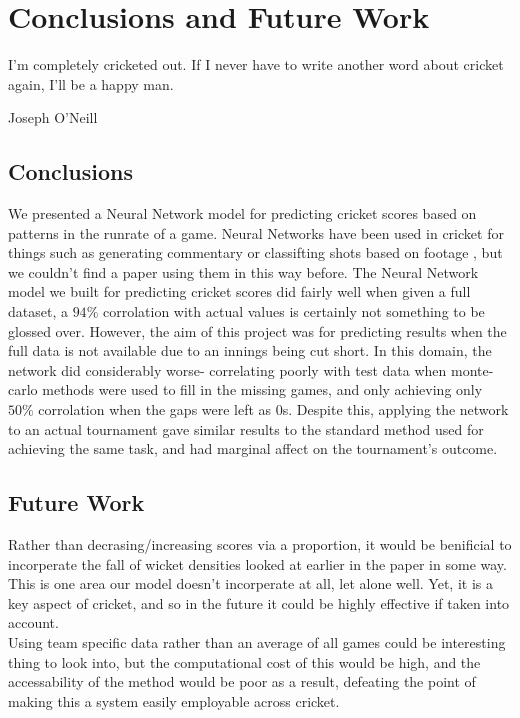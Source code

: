 \chapter{Conclusions and Future Work}

\epigraph{I'm completely cricketed out. If I never have to write another word about cricket again, I'll be a happy man.}{Joseph O'Neill}

\section{Conclusions}
We presented a Neural Network model for predicting cricket scores based on patterns in the runrate of a game. Neural Networks have been used in cricket for things such as 
generating commentary \cite{kumar2} or classifting shots based on footage \cite{foysal}, but we couldn't find a paper using them in this way before. 
The Neural Network model we built for predicting cricket scores did fairly well when given a full dataset, a $94\%$ corrolation with actual values is certainly not 
something to be glossed over. However, the aim of this project was for predicting results when the full data is not available due to an innings being cut short. 
In this domain, the network did considerably worse- correlating poorly with test data when monte-carlo methods were used to fill in the missing games, and only achieving only $50\%$ 
corrolation when the gaps were left as 0s. Despite this, applying the network to an actual tournament gave similar results to the standard method used for achieving the same task, and had 
marginal affect on the tournament's outcome. 


\section{Future Work}
Rather than decrasing/increasing scores via a proportion, it would be benificial to incorperate the fall of wicket densities looked at earlier in the paper in some way. This is one 
area our model doesn't incorperate at all, let alone well. Yet, it is a key aspect of cricket, and so in the future it could be highly effective if taken into account. \\

Using team specific data rather than an average of all games could be interesting thing to look into, but the computational cost of this would be high, and the accessability of the 
method would be poor as a result, defeating the point of making this a system easily employable across cricket. \\

